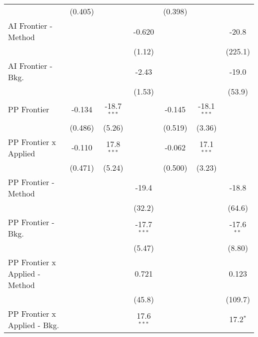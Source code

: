 \begin{tabular}{lcccccc}
                                  & (0.405)        &               &               & (0.398)        &               &   \\   
   AI Frontier - Method           &                &               & -0.620        &                &               & -20.8\\   
                                  &                &               & (1.12)        &                &               & (225.1)\\   
   AI Frontier - Bkg.             &                &               & -2.43         &                &               & -19.0\\   
                                  &                &               & (1.53)        &                &               & (53.9)\\   
   PP Frontier                    & -0.134         & -18.7$^{***}$ &               & -0.145         & -18.1$^{***}$ &   \\   
                                  & (0.486)        & (5.26)        &               & (0.519)        & (3.36)        &   \\   
   PP Frontier x Applied          & -0.110         & 17.8$^{***}$  &               & -0.062         & 17.1$^{***}$  &   \\   
                                  & (0.471)        & (5.24)        &               & (0.500)        & (3.23)        &   \\   
   PP Frontier - Method           &                &               & -19.4         &                &               & -18.8\\   
                                  &                &               & (32.2)        &                &               & (64.6)\\   
   PP Frontier - Bkg.             &                &               & -17.7$^{***}$ &                &               & -17.6$^{**}$\\   
                                  &                &               & (5.47)        &                &               & (8.80)\\   
   PP Frontier x Applied - Method &                &               & 0.721         &                &               & 0.123\\   
                                  &                &               & (45.8)        &                &               & (109.7)\\   
   PP Frontier x Applied - Bkg.   &                &               & 17.6$^{***}$  &                &               & 17.2$^{*}$\\   

\end{tabular}
